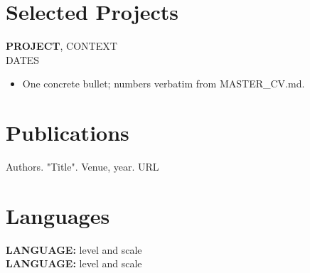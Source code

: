 \documentclass[11pt]{article}
\newcommand{\entry}[3]{\textbf{#1}, #2\\#3\par\vspace{1pt}}
\begin{document}

\section{Selected Projects}

\entry{{{PROJECT}}}{{{CONTEXT}}}{{{DATES}}}
\begin{itemize}
  \item {{One concrete bullet; numbers verbatim from MASTER_CV.md.}}
\end{itemize}


\section{Publications}
{{Authors. "Title". Venue, year. URL}}

\section{Languages}
\textbf{{{LANGUAGE}}:} {{level and scale}}\\
\textbf{{{LANGUAGE}}:} {{level and scale}}
\end{document}
